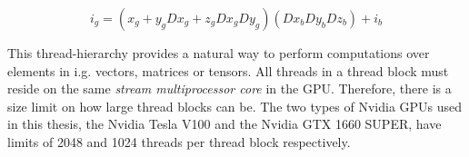 \begin{equation}
  i_g = (x_g + y_gDx_g + z_gDx_gDy_g)(Dx_bDy_bDz_b) + i_b
\end{equation}

This thread-hierarchy provides a natural way to perform computations over elements in i.g. vectors, matrices or tensors.
All threads in a thread block must reside on the same \textit{stream multiprocessor core} in the GPU.
Therefore, there is a size limit on how large thread blocks can be.
The two types of Nvidia GPUs used in this thesis, the Nvidia Tesla V100 and the Nvidia GTX 1660 SUPER, have limits of 2048 and 1024 threads per thread block respectively.


